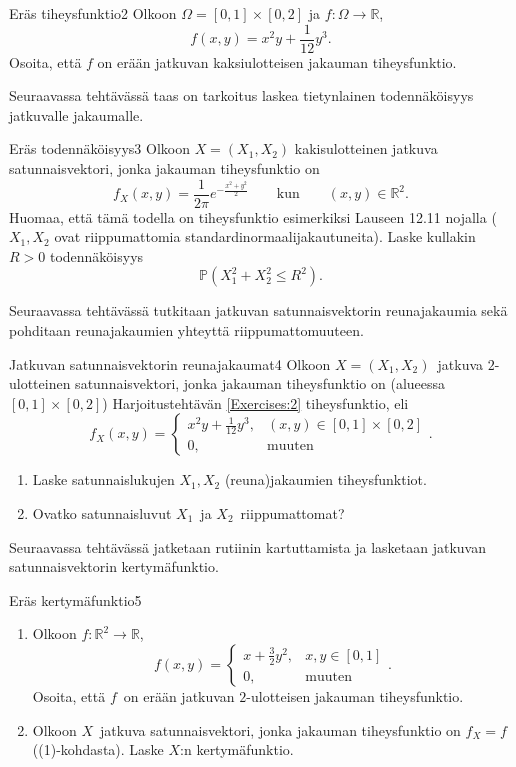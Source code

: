 \documentclass[11pt,a4paper]{amsart}
\newcommand{\R}{\mathbb{R}}
\newcommand{\1}{\mathbf{1}}
\renewcommand{\P}{\mathbb P}
\begin{document}
\begin{Exercises}{Eräs tiheysfunktio}{2}
Olkoon $\Omega=[0,1]\times [0,2]$ ja $f:\Omega\to \R$, 
\[
f(x,y)= x^2 y+\frac{1}{12} y^3.
\]
Osoita, että $f$ on erään jatkuvan kaksiulotteisen jakauman tiheysfunktio.

\end{Exercises}

Seuraavassa tehtävässä taas on tarkoitus laskea tietynlainen todennäköisyys jatkuvalle jakaumalle.


\begin{Exercises}{Eräs todennäköisyys}{3}
Olkoon $X=(X_1,X_2)$ kakisulotteinen jatkuva satunnaisvektori, jonka jakauman tiheysfunktio on 
\[
f_X(x,y)=\frac{1}{2\pi}e^{-\frac{x^2+y^2}{2}} \qquad \text{kun} \qquad (x,y)\in \R^2.
\]
Huomaa, että tämä todella on tiheysfunktio esimerkiksi Lauseen 12.11 nojalla ($X_1,X_2$ ovat riippumattomia standardinormaalijakautuneita). Laske kullakin $R>0$ todennäköisyys 
\[
\P(X_1^2+X_2^2\leq R^2).
\] 

\end{Exercises}

Seuraavassa tehtävässä tutkitaan jatkuvan satunnaisvektorin reunajakaumia sekä pohditaan reunajakaumien yhteyttä riippumattomuuteen.


\begin{Exercises}{Jatkuvan satunnaisvektorin reunajakaumat}{4}
Olkoon $X=(X_1,X_2)$ jatkuva $2$-ulotteinen satunnaisvektori, jonka jakauman tiheysfunktio on (alueessa $[0,1]\times[0,2]$) Harjoitustehtävän \ref{Exercises:2} tiheysfunktio, eli 
\[
f_{X}(x,y)=\begin{cases}
x^2y +\frac{1}{12}y^3, & (x,y)\in [0,1]\times [0,2]\\
0, & \text{muuten}
\end{cases}.
\] 
\begin{enumerate}
\item Laske satunnaislukujen $X_1,X_2$ (reuna)jakaumien tiheysfunktiot.

\item Ovatko satunnaisluvut $X_1$ ja $X_2$ riippumattomat? 

\end{enumerate}
\end{Exercises}

Seuraavassa tehtävässä jatketaan rutiinin kartuttamista ja lasketaan jatkuvan satunnaisvektorin kertymäfunktio.

\begin{Exercises}{Eräs kertymäfunktio}{5}
\begin{enumerate}
\item Olkoon $f:\R^2\to \R$,
\[
f(x,y)=\begin{cases}
x+\frac{3}{2}y^2, & x,y\in [0,1]\\
0, & \text{muuten}
\end{cases}.
\]
Osoita, että $f$ on erään jatkuvan $2$-ulotteisen jakauman tiheysfunktio.

\item Olkoon $X$ jatkuva satunnaisvektori, jonka jakauman tiheysfunktio on $f_X=f$ ((1)-kohdasta). Laske $X$:n kertymäfunktio.

\end{enumerate}
\end{Exercises}
\end{document}
